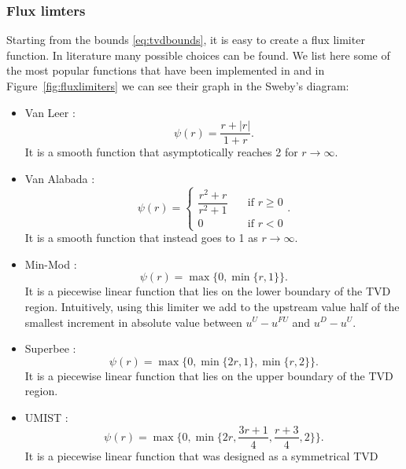 \subsubsection{Flux limters}
Starting from the bounds \eqref{eq:tvdbounds}, it is easy to create a 
flux limiter function. In literature many possible choices can be 
found. 
We list here some of the most popular functions that have been implemented in 
\DUMUX and in Figure~\ref{fig:fluxlimiters} we can see their graph in the 
Sweby's diagram:
\begin{itemize}
	\item Van Leer \cite{tvd:vanleer}:
	\begin{equation} \label{eq:vl}
	\psi(r) = \frac{r+|r|}{1+r}.
	\end{equation}
	It is a smooth function that asymptotically reaches 2 for $r \rightarrow 
	\infty$.
%
	\item Van Alabada \cite{tvd:vanalabada}:
	\begin{equation} \label{eq:vanalabada}
	\psi(r)=
	\begin{cases}
	\dfrac{r^2+r}{r^2+1} \quad &\text{if $r\geq 0$}\\[2ex]
	0 \quad &\text{if $r<0$}
	\end{cases}.
	\end{equation}
	It is a smooth function that instead goes to 1 as $r \rightarrow \infty$.
%
	\item Min-Mod \cite{tvd:roe}:
	\begin{equation} \label{eq:minmod}
	\psi(r) = \max \{0, \min \{ r,1\} \}.
	\end{equation}
	It is a piecewise linear function that lies on the lower boundary of the 
	TVD region. Intuitively, using this limiter we add to the upstream value  
	half of	the smallest increment in absolute value between $u^U-u^{FU}$ and 
	$u^D - u^U$.
%
	\item Superbee \cite{tvd:roe}:
	\begin{equation} \label{eq:superbee}
	\psi(r)=\max \{0, \min \{ 2r, 1\}, \min \{ r, 2\} \}.
	\end{equation}
	It is a piecewise linear function that lies on the upper boundary of the 
	TVD region.
%
	\item UMIST \cite{tvd:lien}:
	\begin{equation} \label{eq:umist}
	\psi(r)=\max \bigg\{0, \min \bigg\{ 2r, \frac{3r+1}{4},\frac{r+3}{4}, 
	2\bigg\} \bigg\}.
	\end{equation}
	It is a piecewise linear function that was designed as a symmetrical TVD 

\end{itemize}
